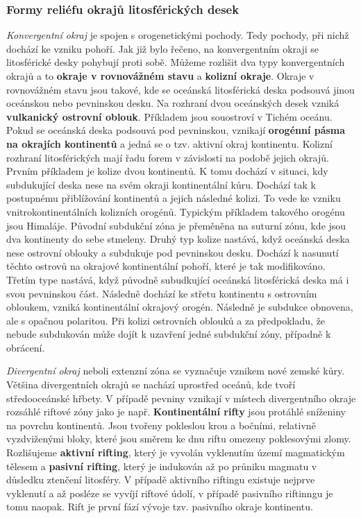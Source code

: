 \subsubsection{Formy reliéfu okrajů litosférických desek}
\emph{Konvergentní okraj} je spojen s orogenetickými pochody. Tedy pochody, při nichž dochází ke vzniku pohoří. Jak již bylo řečeno, na konvergentním okraji se litosférické desky pohybují proti sobě. Můžeme rozlišit dva typy konvergentních okrajů a to \textbf{okraje v rovnovážném stavu} a \textbf{kolizní okraje}. Okraje v rovnovážném stavu jsou takové, kde se oceánská litosférická deska podsouvá jinou oceánskou nebo pevninskou desku. Na rozhraní dvou oceánských desek vzniká \textbf{vulkanický ostrovní oblouk}. Příkladem jsou souostroví v Tichém oceánu. Pokud se oceánská deska podsouvá pod pevninskou, vznikají \textbf{orogénní pásma na okrajích kontinentů} a jedná se o tzv. aktivní okraj kontinentu. Kolizní rozhraní litosférických mají řadu forem v závislosti na podobě jejich okrajů. Prvním příkladem je kolize dvou kontinentů. K tomu dochází v situaci, kdy subdukující deska nese na svém okraji kontinentální kůru. Dochází tak k postupnému přiblížování kontinentů a jejich následné kolizi. To vede ke vzniku vnitrokontinentálních kolizních orogénů. Typickým příkladem takového orogénu jsou Himaláje. Původní subdukční zóna je přeměněna na suturní zónu, kde jsou dva kontinenty do sebe stmeleny. Druhý typ kolize nastává, když oceánská deska nese ostrovní oblouky a subdukuje pod pevninskou desku. Dochází k nasunutí těchto ostrovů na okrajové kontinentální pohoří, které je tak modifikováno. Třetím type nastává, když původně subudkující oceánská litosférická deska má i svou pevninskou část. Následně dochází ke střetu kontinentu s ostrovním obloukem, vzniká kontinentální okrajový orogén. Následně je subdukce obnovena, ale s opačnou polaritou. Při kolizi ostrovních oblouků a za předpokladu, že nebude subdukován může dojít k uzavření jedné subdukční zóny, případně k obrácení.

\emph{Divergentní okraj} neboli extenzní zóna se vyznačuje vznikem nové zemské kůry. Většina divergentních okrajů se nachází uprostřed oceánů, kde tvoří středooceánské hřbety. V případě pevniny vznikají v místech divergentního okraje rozsáhlé riftové zóny jako je např. 
\textbf{Kontinentální rifty} jsou protáhlé sníženiny na povrchu kontinentů. Jsou tvořeny pokleslou krou a bočními, relativně vyzdviženými bloky, které jsou směrem ke dnu riftu omezeny poklesovými zlomy. Rozlišujeme \textbf{aktivní rifting}, který je vyvolán vyklenutím území magmatickým tělesem a \textbf{pasivní rifting}, který je indukován až po průniku magmatu v důsledku ztenčení litosféry. V případě aktivního riftingu existuje nejprve vyklenutí a až posléze se vyvíjí riftové údolí, v případě pasivního riftinngu je tomu naopak. Rift je první fází vývoje tzv. pasivního okraje kontinentu.

